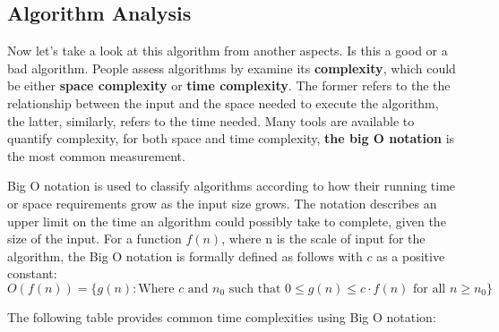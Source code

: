 \documentclass[
	12pt, %
	fleqn, %
	a4paper, %
]{LegrandOrangeBook}
\begin{document}
\subsection{Algorithm Analysis}

\par Now let's take a look at this algorithm from another aspects. Is this a good or a bad algorithm. People assess algorithms by examine its \textbf{complexity}, which could be either \textbf{space complexity} or \textbf{time complexity}. The former refers to the the relationship between the input and the space needed to execute the algorithm, the latter, similarly, refers to the time needed. Many tools are available to quantify complexity, for both space and time complexity, \textbf{the big O notation} is the most common measurement. 
\begin{definition}\label{Big O}
    Big O notation is used to classify algorithms according to how their running time or space requirements grow as the input size grows. The notation describes an upper limit on the time an algorithm could possibly take to complete, given the size of the input. For a function \( f(n) \), where n is the scale of input for the algorithm, the Big O notation is formally defined as follows with $c$ as a positive constant:
    $$O(f(n)) = \{ g(n) : \text{Where } c \text{ and } n_0 
	\text{ such that } 0 \leq g(n) \leq c \cdot f(n) \text{ for all } n \geq n_0 \}$$
\end{definition}

The following table provides common time complexities using Big O notation:
\end{document}
